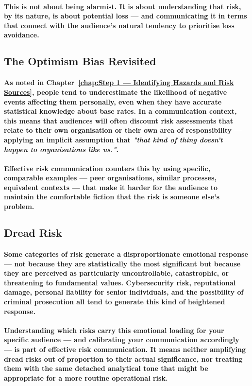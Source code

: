 \paragraph{This is not about being alarmist. It is about understanding that risk, by its nature, is about potential loss — and communicating it in terms that connect with the audience's natural tendency to prioritise loss avoidance.}

\subsection{The Optimism Bias Revisited}
\paragraph{As noted in Chapter~\ref{chap:Step 1 — Identifying Hazards and Risk Sources}, people tend to underestimate the likelihood of negative events affecting them personally, even when they have accurate statistical knowledge about base rates. In a communication context, this means that audiences will often discount risk assessments that relate to their own organisation or their own area of responsibility — applying an implicit assumption that \textit{"that kind of thing doesn't happen to organisations like us."}.}
\paragraph{Effective risk communication counters this by using specific, comparable examples — peer organisations, similar processes, equivalent contexts — that make it harder for the audience to maintain the comfortable fiction that the risk is someone else's problem.}

\subsection{Dread Risk}
\paragraph{Some categories of risk generate a disproportionate emotional response — not because they are statistically the most significant but because they are perceived as particularly uncontrollable, catastrophic, or threatening to fundamental values. Cybersecurity risk, reputational damage, personal liability for senior individuals, and the possibility of criminal prosecution all tend to generate this kind of heightened response.}
\paragraph{Understanding which risks carry this emotional loading for your specific audience — and calibrating your communication accordingly — is part of effective risk communication. It means neither amplifying dread risks out of proportion to their actual significance, nor treating them with the same detached analytical tone that might be appropriate for a more routine operational risk.}

